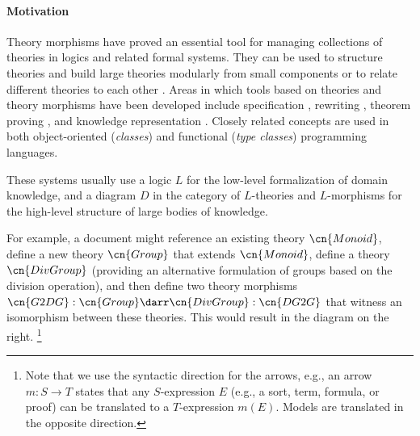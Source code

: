 \paragraph{Motivation}
Theory morphisms have proved an essential tool for managing collections of theories in logics and related formal systems.
They can be used to structure theories and build large theories modularly from small components or to relate different theories to each other \cite{asl,devgraphs,littletheories}.
Areas in which tools based on theories and theory morphisms have been developed include specification \cite{obj,hets}, rewriting \cite{maude}, theorem proving \cite{imps,isabelle_locales}, and knowledge representation \cite{RK:mmt:10}.
Closely related concepts are used in both object-oriented (\emph{classes}) and functional (\emph{type classes}) programming languages.


These systems usually use a logic $L$ for the low-level formalization of domain knowledge, and a diagram $D$ in the category of $L$-theories and $L$-morphisms for the high-level structure of large bodies of knowledge.

\begin{figure}
\vspace{-3em}
\vspace{-3.5em}
\end{figure}

For example, a document might reference an existing theory $\cn{Monoid}$, define a new theory $\cn{Group}$ that extends $\cn{Monoid}$, define a theory $\cn{DivGroup}$ (providing an alternative formulation of groups based on the division operation), and then define two theory morphisms $\cn{G2DG}:\cn{Group}\darr \cn{DivGroup}:\cn{DG2G}$ that witness an isomorphism between these theories.
This would result in the diagram on the right.%
\footnote{Note that we use the syntactic direction for the arrows, e.g., an arrow $m:S\to T$ states that any $S$-expression $E$ (e.g., a sort, term, formula, or proof) can be translated to a $T$-expression $m(E)$. Models are translated in the opposite direction.}

